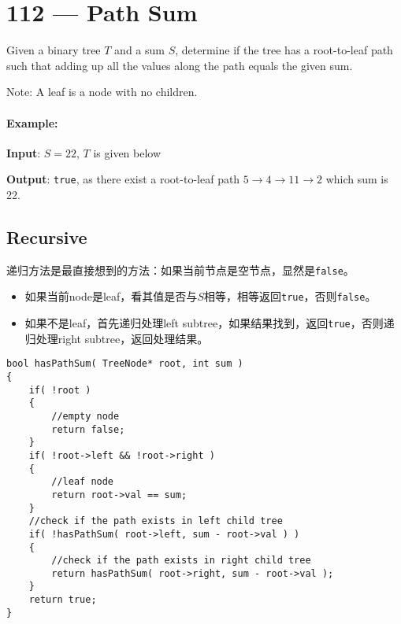 \section{112 --- Path Sum}
Given a binary tree $T$ and a sum $S$, determine if the tree has a root-to-leaf path such that adding up all the values along the path equals the given sum.
\par
Note: A leaf is a node with no children.
\paragraph{Example:}
\begin{flushleft}
\textbf{Input}: $S=22$, $T$ is given below
\begin{figure}[H]
\end{figure}
\textbf{Output}: \texttt{true}, as there exist a root-to-leaf path $5\to4\to11\to2$ which sum is 22.
\end{flushleft}
\subsection{Recursive}
递归方法是最直接想到的方法：如果当前节点是空节点，显然是\texttt{false}。
\begin{itemize}
    \item 如果当前node是leaf，看其值是否与$S$相等，相等返回\texttt{true}，否则\texttt{false}。
    \item 如果不是leaf，首先递归处理left subtree，如果结果找到，返回\texttt{true}，否则递归处理right subtree，返回处理结果。
\end{itemize}

\setcounter{lstlisting}{0}
\begin{lstlisting}[style=customc, caption={Recursion}]
bool hasPathSum( TreeNode* root, int sum )
{
    if( !root )
    {
        //empty node
        return false;
    }
    if( !root->left && !root->right )
    {
        //leaf node
        return root->val == sum;
    }
    //check if the path exists in left child tree
    if( !hasPathSum( root->left, sum - root->val ) )
    {
        //check if the path exists in right child tree
        return hasPathSum( root->right, sum - root->val );
    }
    return true;
}
\end{lstlisting}